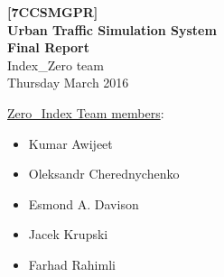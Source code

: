 \begin{titlepage}
    \begin{center}
        \vspace*{6cm}
        \noindent\makebox[\linewidth]{\rule{\paperwidth}{0.4pt}}
        \Huge
        \textbf{[7CCSMGPR]\\Urban Traffic Simulation System\\}
        \vspace{0.5cm}
        \Large
        \textbf{Final Report\\}
        \vspace{1.5cm}
        \large
        \textsf{Index\_Zero team\\}
        \vspace{1cm}
        \textsf{Thursday  March 2016}
        \noindent\makebox[\linewidth]{\rule{\paperwidth}{0.4pt}}
        \vfill
	\end{center}
    \vspace{1cm}
    \underline{\textsf{Zero\_Index Team members}}:
    \begin{itemize}
        \item Kumar Awijeet
        \item Oleksandr Cherednychenko
        \item Esmond A. Davison
        \item Jacek Krupski
        \item Farhad Rahimli
    \end{itemize}

\end{titlepage}